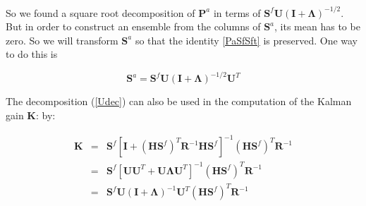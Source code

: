 \documentclass[a4paper,12pt]{article}
\begin{document}
So we found a square root decomposition of $\mathbf{P}^a$ in terms of $\mathbf{S}^f\mathbf{U}(\mathbf I + \mathbf \Lambda)^{-1/2}$. But in order to construct an ensemble from the columns of $\mathbf S^a$, its mean has to be zero. So we will transform $\mathbf S^a$ so that the identity \eqref{PaSfSft} is preserved. One way to do this is

\begin{equation}
   \mathbf S^a = \mathbf S^f \mathbf U (\mathbf I + \mathbf \Lambda)^{-1/2} \mathbf U^T  %
\end{equation}


The decomposition (\ref{Udec}) can also be used in the computation of the Kalman gain $\mathbf K$:
by:

\begin{eqnarray}
 \mathbf K 
&=&
\mathbf S^f
\left[
\mathbf I + (\mathbf H \mathbf S^f)^T\mathbf R^{-1} \mathbf H \mathbf S^f 
\right]^{-1}
(\mathbf H \mathbf S^f)^T\mathbf R^{-1} \\
&=&
\mathbf S^f
\left[
\mathbf U \mathbf U^T + \mathbf U \mathbf \Lambda \mathbf U^T
\right]^{-1}
(\mathbf H \mathbf S^f)^T\mathbf R^{-1} \\
&=&
 \mathbf S^f \mathbf U (\mathbf I + \mathbf \Lambda)^{-1} \mathbf U^T (\mathbf H \mathbf S^f)^T \mathbf R^{-1}\label{KU}
\end{eqnarray}

\newcommand{\one}{ \mathbf 1_{N \times 1}}




\end{document}
